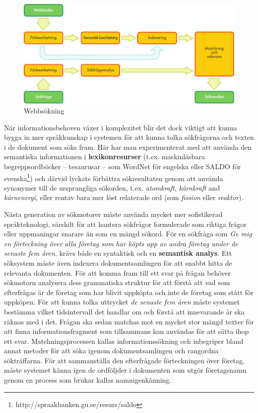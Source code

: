 \begin{multicols}{2}

\begin{figure}[htb]
  \center
  \includegraphics[width=\textwidth]{../_media/swedish/web_search_architecture}
  \caption{Webbsökning}
  \label{fig:websearcharch_sv}
\end{figure}

När informationsbehoven växer i komplexitet blir det dock viktigt att
kunna bygga in mer språkkunskap i systemen för att kunna tolka
sökfrågorna och texten i de dokument som söks fram. Här har man
experimenterat med att använda den semantiska informationen i
\textbf{lexikonresurser} (t.ex. maskinläsbara begreppsordböcker --
tesaurusar -- som WordNet för engelska eller SALDO för
svenska\footnote{http://spraakbanken.gu.se/resurs/saldo}) och därvid
lyckats förbättra sökresultaten genom att använda synonymer till de
ursprungliga sökorden, t.ex. \textit{atomkraft}, \textit{kärnkraft}
and \textit{kärnenergi}, eller rentav bara mer löst relaterade ord
(som \textit{fission} eller \textit{reaktor}).

Nästa generation av sökmotorer måste använda mycket mer sofistikerad
språkteknologi, särskilt för att hantera sökfrågor formulerade som
riktiga frågor eller uppmaningar snarare än som en mängd sökord. För
en sökfråga som \textit{Ge mig en förteckning över alla företag som
  har köpts upp av andra företag under de senaste fem åren}, krävs
både en syntaktisk och en \textbf{semantisk analys}. Ett söksystem 
måste även indexera dokumentsamlingen för att snabbt hitta de
relevanta dokumenten. För att komma fram till ett svar på frågan
behöver sökmotorn analysera dess grammatiska struktur för att förstå
att vad som efterfrågas är de företag som har blivit uppköpta och inte
de företag som stått för uppköpen. För att kunna tolka uttrycket
\textit{de senaste fem åren} måste systemet bestämma vilket
tidsintervall det handlar om och förstå att innevarande år ska räknas
med i det. Frågan ska sedan matchas mot en mycket stor mängd texter
för att finna informationsfragment som tillsammans kan användas för
att sätta ihop ett svar. Matchnings\-pro\-cess\-en kallas
informationssökning och inbegriper bland annat metoder för att söka
igenom dokumentsam\-ling\-en och rangordna sökträffarna. För att
sammanställa den efterfrågade förteckningen över företag, måste
systemet känna igen de ordföljder i dokumenten som utgör företagsnamn
genom en process som brukar kallas namnigenkänning.


\end{multicols}
